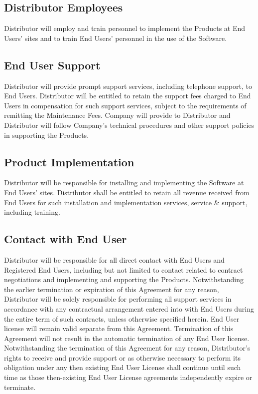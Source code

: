 \documentclass[letterpaper,10pt,english]{sphinxmanual}
\begin{document}
\subsection{Distributor Employees}
\label{\detokenize{additionalresponsibilities2:distributor-employees}}
Distributor will employ and train personnel to implement the Products at End Users’ sites and to train End Users’ personnel in the use of the Software.


\subsection{End User Support}
\label{\detokenize{additionalresponsibilities2:end-user-support}}
Distributor will provide prompt support services, including telephone support, to End Users. Distributor will be entitled to retain the support fees charged to End Users in compensation for such support services, subject to the requirements of remitting the Maintenance Fees. Company will provide to Distributor and Distributor will follow Company’s technical procedures and other support policies in supporting the Products.


\subsection{Product Implementation}
\label{\detokenize{additionalresponsibilities2:product-implementation}}
Distributor will be responsible for installing and implementing the Software at End Users’ sites. Distributor shall be entitled to retain all revenue received from End Users for such installation and implementation services, service \& support, including training.


\subsection{Contact with End User}
\label{\detokenize{additionalresponsibilities2:contact-with-end-user}}
Distributor will be responsible for all direct contact with End Users and Registered End Users, including but not limited to contact related to contract negotiations and implementing and supporting the Products. Notwithstanding the earlier termination or expiration of this Agreement for any reason, Distributor will be solely responsible for performing all support services in accordance with any contractual arrangement entered into with End Users during the entire term of such contracts, unless otherwise specified herein.  End User license will remain valid separate from this Agreement.  Termination of this Agreement will not result in the automatic termination of any End User license.  Notwithstanding the termination of this Agreement for any reason, Distributor’s rights to receive and provide support or as otherwise necessary to perform its obligation under any then \textendash{} existing End User License shall continue until such time as those then-existing End User License agreements independently expire or terminate.
\end{document}

